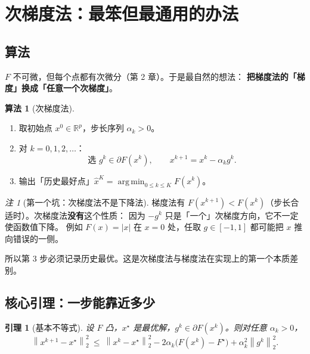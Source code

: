 \documentclass[11pt,a4paper,UTF8]{ctexart}
\theoremstyle{plain}
\newtheorem{lemma}[theorem]{引理}
\theoremstyle{definition}
\newtheorem{algorithmbox}[theorem]{算法}
\theoremstyle{remark}
\newtheorem{remark}[theorem]{注}
\newcommand{\R}{\mathbb{R}}
\newcommand{\norm}[1]{\left\lVert #1 \right\rVert}
\newcommand{\abs}[1]{\left\lvert #1 \right\rvert}
\DeclareMathOperator*{\argmin}{arg\,min}
\begin{document}
\section{次梯度法：最笨但最通用的办法}

\subsection{算法}

$F$ 不可微，但每个点都有次微分（第 2 章）。于是最自然的想法：
\textbf{把梯度法的「梯度」换成「任意一个次梯度」}。

\begin{algorithmbox}[次梯度法]
\begin{enumerate}
\item 取初始点 $x^0\in\R^p$，步长序列 $\alpha_k>0$。
\item 对 $k=0,1,2,\dots$：
\[
\text{选 } g^k\in\partial F(x^k),\qquad
x^{k+1}=x^k-\alpha_k g^k .
\]
\item 输出「历史最好点」$\hat x^K=\argmin_{0\le k\le K}F(x^k)$。
\end{enumerate}
\end{algorithmbox}

\begin{remark}[第一个坑：次梯度法不是下降法]
梯度法有 $F(x^{k+1})<F(x^k)$（步长合适时）。次梯度法\textbf{没有}这个性质：
因为 $-g^k$ 只是「一个」次梯度方向，它不一定使函数值下降。
例如 $F(x)=\abs{x}$ 在 $x=0$ 处，任取 $g\in[-1,1]$ 都可能把 $x$ 推向错误的一侧。

所以第 3 步必须记录历史最优。这是次梯度法与梯度法在实现上的第一个本质差别。
\end{remark}

\subsection{核心引理：一步能靠近多少}

\begin{lemma}[基本不等式]\label{lem:sgfund}
设 $F$ 凸，$x^\star$ 是最优解，$g^k\in\partial F(x^k)$。则对任意 $\alpha_k>0$，
\begin{equation}
\norm{x^{k+1}-x^\star}_2^2
\ \le\ \norm{x^k-x^\star}_2^2-2\alpha_k\bigl(F(x^k)-F^\star\bigr)+\alpha_k^2\norm{g^k}_2^2 .
\label{eq:sgfund}
\end{equation}
\end{lemma}
\end{document}
